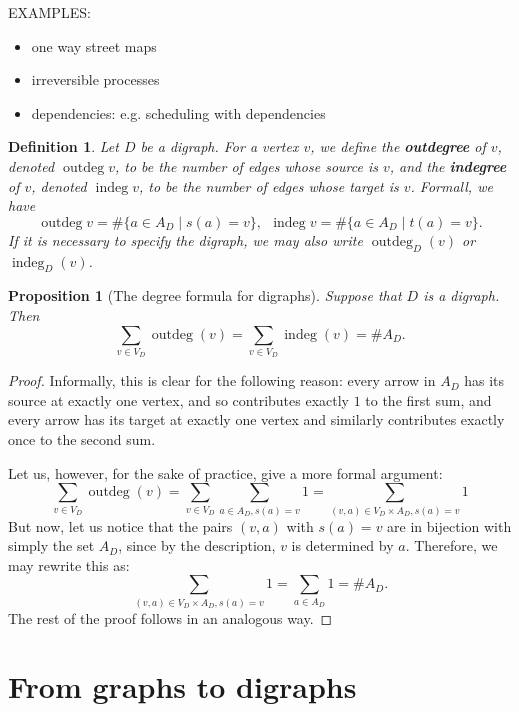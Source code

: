 \documentclass[12pt]{report}
\theoremstyle{plain}
\newtheorem{defn}[thm]{Definition}
\newtheorem{prop}[thm]{Proposition}
\newcommand{\oper}[1]{\operatorname{#1}}
\newcommand{\Xb}[1]{\textbf{#1}\index{#1}}
\begin{document}
EXAMPLES:
\begin{itemize}
\item one way street maps
\item irreversible processes
\item dependencies: e.g. scheduling with dependencies
\end{itemize}

\newcommand{\outdeg}{\oper{outdeg}}
\newcommand{\indeg}{\oper{indeg}}

\begin{defn}
Let $D$ be a digraph. For a vertex $v$, we define the \Xb{outdegree} of
$v$, denoted $\outdeg v$, to be the number of edges whose source is $v$,
and the \Xb{indegree} of $v$, denoted $\indeg v$, to be the number of edges
whose target is $v$.
Formall, we have
\[ \outdeg v = \#\{a \in A_D \mid  s(a) = v\} ,\ \ 
\indeg v = \#\{a \in A_D \mid t(a) = v\}.
\]
If it is necessary to specify the digraph, we may also write $\outdeg_D(v)$
or $\indeg_D(v)$.
\end{defn}

\begin{prop}[The degree formula for digraphs]
Suppose that $D$ is a digraph. Then 
\[\sum_{v \in V_D} \outdeg(v) = \sum_{v \in V_D} \indeg(v) = \#A_D.\]
\end{prop}
\begin{proof}
Informally, this is clear for the following reason: every arrow in $A_D$
has its source at exactly one vertex, and so contributes exactly $1$ to the
first sum, and every arrow has its target at exactly one vertex and
similarly contributes exactly once to the second sum.

Let us, however, for the sake of practice, give a more formal argument:
\[\sum_{v \in V_D} \outdeg(v) = \sum_{v \in V_D} \sum_{a \in A_D, s(a) = v}
1 = \sum_{(v, a) \in V_D \times A_D, s(a) = v} 1 \]
But now, let us notice that the pairs $(v, a)$ with $s(a) = v$ are in
bijection with simply the set $A_D$, since by the description, $v$ is
determined by $a$. Therefore, we may rewrite this as:
\[\sum_{(v, a) \in V_D \times A_D, s(a) = v} 1  = \sum_{a \in A_D} 1 =
\#A_D.\]
The rest of the proof follows in an analogous way.

\end{proof}

\section{From graphs to digraphs}
\end{document}
